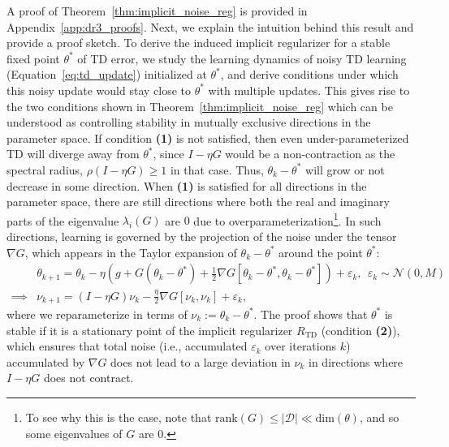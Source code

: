 A proof of Theorem~\ref{thm:implicit_noise_reg} is provided in Appendix~\ref{app:dr3_proofs}. Next, we explain the intuition behind this result and provide a proof sketch. To derive the induced implicit regularizer for a stable fixed point $\theta^*$ of TD error, we study the learning dynamics of noisy TD learning (Equation~\ref{eq:td_update}) initialized at $\theta^*$, and derive conditions under which this noisy update would stay close to $\theta^*$ with multiple updates.  This gives rise to the two conditions shown in Theorem~\ref{thm:implicit_noise_reg} which can be understood as controlling stability in mutually exclusive directions in the parameter space. If condition \textbf{(1)} is not satisfied, then even under-parameterized TD will diverge away from $\theta^*$, since $I - \eta G$ would be a non-contraction as the spectral radius, $\rho(I - \eta G) \geq 1$ in that case. Thus, $\theta_k - \theta^*$ will grow or not decrease in some direction. When \textbf{(1)} is satisfied for all directions in the parameter space, there are still directions where both the real and imaginary parts of the eigenvalue $\lambda_i(G)$ are $0$ due to overparameterization\footnote{To see why this is the case, note that $\text{rank}(G) \leq |\mathcal{D}| \ll \text{dim}(\theta)$, and so some eigenvalues of $G$ are $0$.}. 
In such directions, learning is governed by the projection of the noise under the tensor  $\nabla G$,
which appears in the Taylor expansion of $\theta_k - \theta^*$ around the point $\theta^*$:
\begin{align}
    \label{eqn:nu_k}
    &\theta_{k+1} = \theta_k - \eta \left(g + G (\theta_k - \theta^*) + \frac{1}{2} \nabla G [\theta_k -\theta^*, \theta_k - \theta^*] \right) + \varepsilon_k, ~~ \varepsilon_k \sim \mathcal{N}(0, M)\\
    \implies &\nu_{k+1} = (I - \eta G )\nu_k  - \frac{\eta}{2} \nabla G [\nu_k, \nu_k] + \varepsilon_k,
    \label{eqn:nu_k_actual}
\end{align}
where we reparameterize in terms of $\nu_k := \theta_k - \theta^*$. The proof shows that $\theta^*$ is stable if it is a stationary point of the implicit regularizer $R_\mathrm{TD}$ (condition \textbf{(2)}), which ensures that total noise (i.e., accumulated $\varepsilon_k$ over iterations $k$) accumulated by $\nabla G$ does not lead to a large deviation in $\nu_k$ in directions where $I - \eta G$ does not contract. 

